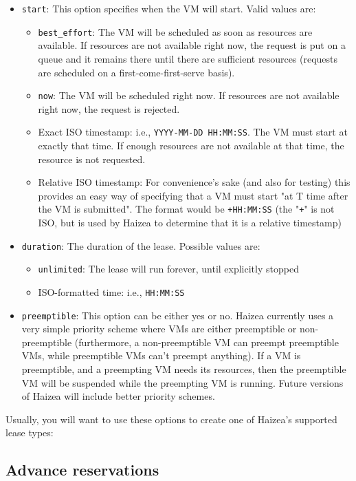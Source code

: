 \begin{itemize}
\item \texttt{start}: This option specifies when the VM will start. Valid values are:
\begin{itemize}
\item \texttt{best\_effort}: The VM will be scheduled as soon as resources are available. If resources are not available right now, the request is put on a queue and it remains there until there are sufficient resources (requests are scheduled on a first-come-first-serve basis).
\item \texttt{now}: The VM will be scheduled right now. If resources are not available right now, the request is rejected.
\item Exact ISO timestamp: i.e., \texttt{YYYY-MM-DD HH:MM:SS}. The VM must start at exactly that time. If enough resources are not available at that time, the resource is not requested.
\item Relative ISO timestamp: For convenience's sake (and also for testing) this provides an easy way of specifying that a VM must start "at T time after the VM is submitted". The format would be \texttt{+HH:MM:SS} (the "\texttt{+}" is not ISO, but is used by Haizea to determine that it is a relative timestamp)
\end{itemize}
\item \texttt{duration}: The duration of the lease. Possible values are:
\begin{itemize}
\item \texttt{unlimited}: The lease will run forever, until explicitly stopped
\item ISO-formatted time: i.e., \texttt{HH:MM:SS}
\end{itemize}
\item \texttt{preemptible}: This option can be either yes or no. Haizea currently uses a very simple priority scheme where VMs are either preemptible or non-preemptible (furthermore, a non-preemptible VM can preempt preemptible VMs, while preemptible VMs can't preempt anything). If a VM is preemptible, and a preempting VM needs its resources, then the preemptible VM will be suspended while the preempting VM is running. Future versions of Haizea will include better priority schemes.
\end{itemize}

Usually, you will want to use these options to create one of Haizea's supported lease types:

\subsection{Advance reservations}

